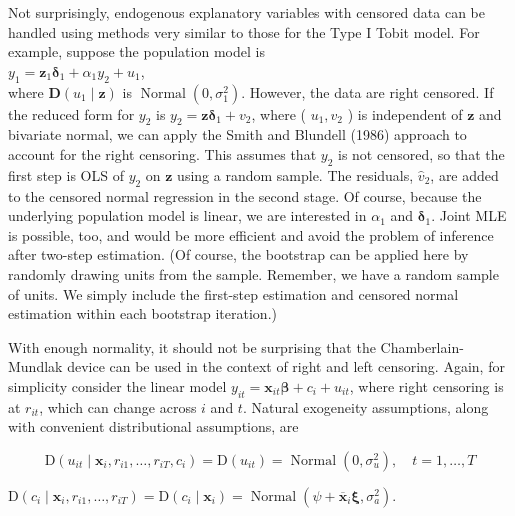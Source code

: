 \documentclass[10pt]{article}
\begin{document}
Not surprisingly, endogenous explanatory variables with censored data can be handled using methods very similar to those for the Type I Tobit model. For example, suppose the population model is\\
$y_{1}=\mathbf{z}_{1} \boldsymbol{\delta}_{1}+\alpha_{1} y_{2}+u_{1}$,\\
where $\mathbf{D}\left(u_{1} \mid \mathbf{z}\right)$ is $\operatorname{Normal}\left(0, \sigma_{1}^{2}\right)$. However, the data are right censored. If the reduced form for $y_{2}$ is $y_{2}=\mathbf{z} \boldsymbol{\delta}_{1}+v_{2}$, where ( $u_{1}, v_{2}$ ) is independent of $\mathbf{z}$ and bivariate normal, we can apply the Smith and Blundell (1986) approach to account for the right censoring. This assumes that $y_{2}$ is not censored, so that the first step is OLS of $y_{2}$ on $\mathbf{z}$ using a random sample. The residuals, $\hat{v}_{2}$, are added to the censored normal regression in the second stage. Of course, because the underlying population model is linear, we are interested in $\alpha_{1}$ and $\boldsymbol{\delta}_{1}$. Joint MLE is possible, too, and would be more efficient and avoid the problem of inference after two-step estimation. (Of course, the bootstrap can be applied here by randomly drawing units from the sample. Remember, we have a random sample of units. We simply include the first-step estimation and censored normal estimation within each bootstrap iteration.)

With enough normality, it should not be surprising that the Chamberlain-Mundlak device can be used in the context of right and left censoring. Again, for simplicity consider the linear model $y_{i t}=\mathbf{x}_{i t} \boldsymbol{\beta}+c_{i}+u_{i t}$, where right censoring is at $r_{i t}$, which can change across $i$ and $t$. Natural exogeneity assumptions, along with convenient distributional assumptions, are


\begin{equation*}
\mathrm{D}\left(u_{i t} \mid \mathbf{x}_{i}, r_{i 1}, \ldots, r_{i T}, c_{i}\right)=\mathrm{D}\left(u_{i t}\right)=\operatorname{Normal}\left(0, \sigma_{u}^{2}\right), \quad t=1, \ldots, T \tag{19.22}
\end{equation*}


$\mathrm{D}\left(c_{i} \mid \mathbf{x}_{i}, r_{i 1}, \ldots, r_{i T}\right)=\mathrm{D}\left(c_{i} \mid \mathbf{x}_{i}\right)=\operatorname{Normal}\left(\psi+\overline{\mathbf{x}}_{i} \boldsymbol{\xi}, \sigma_{a}^{2}\right)$.
\end{document}
